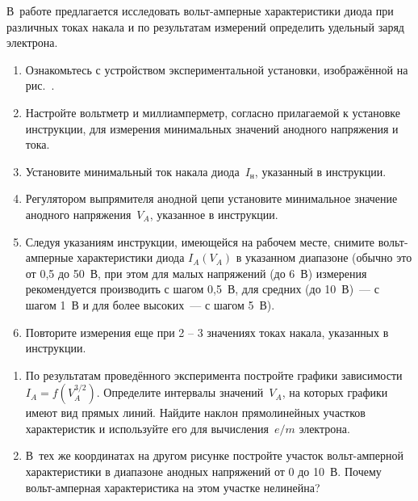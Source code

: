 \begin{lab:task}

В~работе предлагается исследовать вольт-амперные характеристики диода при
различных токах накала и по результатам
измерений определить удельный заряд электрона.

\begin{enumerate}

\item{Ознакомьтесь с устройством экспериментальной установки, изображённой на
рис.~.}

\item{Настройте вольтметр и миллиамперметр, согласно прилагаемой к установке
инструкции, для измерения минимальных значений анодного напряжения и тока.}

\item{ Установите минимальный  ток накала диода~$I_\text{н}$, указанный в
инструкции.}

\item{ Регулятором выпрямителя анодной цепи установите минимальное значение
анодного напряжения~$V_{A}$, указанное в инструкции.}

\item{ Следуя указаниям инструкции, имеющейся на рабочем месте, снимите
вольт-амперные характеристики диода $I_{A}(V_{A})$ в указанном диапазоне (обычно
это от 0,5 до 50~В, при этом для малых напряжений (до 6~В) измерения
рекомендуется производить с шагом 0,5~В, для средних (до 10~В)~--- с шагом 1~В и
для более высоких~--- с шагом 5~В).}

\item{ Повторите измерения еще при 2 -- 3 значениях токах накала, указанных в
инструкции.}
\end{enumerate}


\begin{enumerate}
\item{ По результатам проведённого эксперимента постройте графики зависимости
$I_A = f(V_{A}^{3/2})$. Определите интервалы значений~$V_{A}$, на которых
графики имеют вид прямых линий. Найдите  наклон прямолинейных участков
характеристик и используйте его для вычисления~$e/m$ электрона.}
\item{ В~тех же координатах на другом рисунке постройте участок вольт-амперной
характеристики в диапазоне анодных напряжений от 0 до 10~В. Почему
вольт-амперная характеристика на этом участке нелинейна?}
\end{enumerate}

\end{lab:task}

